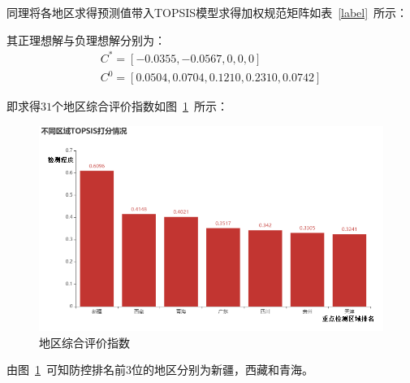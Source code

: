 \documentclass{whutmod}
\begin{document}
    同理将各地区求得预测值带入TOPSIS模型求得加权规范矩阵如表~\ref{label}~所示：
     
    其正理想解与负理想解分别为：
    \begin{gather}
    C^{*}=[-0.0355,-0.0567,0,0,0]\\
    C^{0}=[0.0504,0.0704,0.1210,0.2310,0.0742]
    \end{gather}
    
    即求得$31$个地区综合评价指数如图~\ref{area}~所示：
    \begin{figure}[H]
    	\centering
    	\includegraphics[width=.9\textwidth]{figures/area.png}
    	\caption{地区综合评价指数}\label{area}
    \end{figure}
    由图~\ref{area}~可知防控排名前$3$位的地区分别为新疆，西藏和青海。
    
\end{document}
